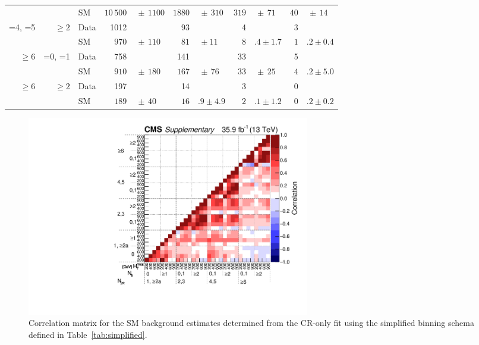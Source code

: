 \begin{table}[!t]
\begin{tabular}{rrlr@{}lr@{}lr@{}lr@{}l}
                   &           & SM   & $10\,500$  & $\,\pm\, 1100$    & $1880$    & $\,\pm\, 310$  & $319$ & $\,\pm\, 71$  & $40$  & $\,\pm\, 14$ \\[0.2ex]
    =4, =5         & ${\geq}2$ & Data & 1012       &                   & 93        &                & 4     &               & 3                    \\
                   &           & SM   & $970$      & $\,\pm\, 110$     & $81$      & $\, \pm 11$    & $8$   & $.4 \pm 1.7$  & $1$   & $.2 \pm 0.4$ \\[0.2ex]
    ${\geq}6$      & =0, =1    & Data & 758        &                   & 141       &                & 33    &               & 5                    \\
                   &           & SM   & $910$      & $\,\pm\, 180$     & $167$     & $\,\pm\, 76$   & $33$  & $\,\pm\, 25$  & $4$   & $.2 \pm 5.0$ \\[0.2ex]
    ${\geq}6$      & ${\geq}2$ & Data & 197        &                   & 14        &                & 3     &               & 0                    \\
                   &           & SM   & $189$      & $\,\pm\, 40$      & $16$      & $.9 \pm 4.9$   & $2$   & $.1 \pm 1.2$  & $0$   & $.2 \pm 0.2$ \\
    \hline
  \end{tabular}
\end{table}
\endgroup

\begin{figure}[!b]
  \centering
  \includegraphics[width=0.6\textwidth]{CMS-SUS-16-038_Figure_005.pdf}
  \caption{Correlation matrix for the SM background estimates
    determined from the CR-only fit using the simplified binning
    schema defined in Table~\ref{tab:simplified}.}
  \label{fig:correlation}
\end{figure}
